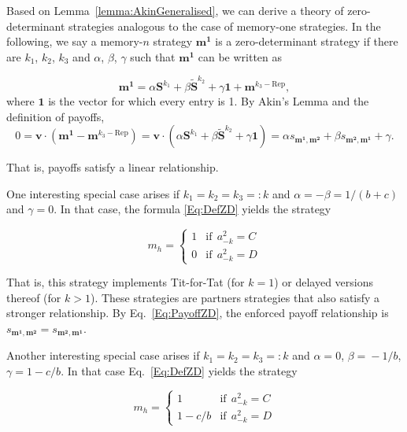 \documentclass{article}
\theoremstyle{definition}
\begin{document}
Based on Lemma~\ref{lemma:AkinGeneralised}, we can derive a theory of
zero-determinant strategies analogous to the case of memory-one strategies. In
the following, we say a memory-$n$ strategy $\mathbf{m^1}$ is a zero-determinant
strategy if there are $k_1$, $k_2$, $k_3$ and $\alpha$, $\beta$, $\gamma$ such
that $\mathbf{m^1}$ can be written as

\begin{equation} \label{Eq:DefZD}
\mathbf{m^1} = \alpha \mathbf{S}^{k_1} + \beta \mathbf{\tilde{S}}^{k_2} + \gamma \mathbf{1} + \mathbf{m}^{k_3-\text{Rep}},  
\end{equation} 
where $\mathbf{1}$ is the vector for which every entry is 1. By Akin's Lemma and the definition of payoffs,
\begin{equation} \label{Eq:PayoffZD}
0 = \mathbf{v} \cdot  (\mathbf{m^1} - \mathbf{m}^{k_3-\text{Rep}}) = \mathbf{v} \cdot (\alpha \mathbf{S}^{k_1} + \beta \mathbf{\tilde{S}}^{k_2} + \gamma \mathbf{1} ) = \alpha s_{\mathbf{m^1}, \mathbf{m^2}} + \beta s_{\mathbf{m^2}, \mathbf{m^1}} + \gamma. 
\end{equation}

That is, payoffs satisfy a linear relationship. 

One interesting special case arises if $k_1\!=\!k_2\!=\!k_3\!=:\!k$ and $\alpha
= -\beta =1/(b\!+\!c)$ and $\gamma=0$. In that case, the formula
\eqref{Eq:DefZD} yields the strategy

\begin{equation}
m_h = \left\{
\begin{array}{ll}
1	&\text{if}~~a^2_{-k}=C\\
0	&\text{if}~~a^2_{-k}=D
\end{array}
\right.
\end{equation}

That is, this strategy implements Tit-for-Tat (for $k\!=\!1$) or delayed
versions thereof (for $k\!>\!1$). These strategies are partners strategies that
also satisfy a stronger relationship. By Eq.~\eqref{Eq:PayoffZD}, the enforced
payoff relationship is $s_{\mathbf{m^1}, \mathbf{m^2}}\!=\! s_{\mathbf{m^2},
\mathbf{m^1}}$.

Another interesting special case arises if  $k_1\!=\!k_2\!=\!k_3\!=:\!k$ and
$\alpha\!=\!0$, $\beta\!=\!-1/b$, $\gamma\!=\!1\!-\!c/b$. In that case
Eq.~\eqref{Eq:DefZD} yields the strategy

\begin{equation}
m_h = \left\{
\begin{array}{ll}
1	&\text{if}~~a^2_{-k}=C\\
1-c/b	&\text{if}~~a^2_{-k}=D
\end{array}
\right.
\end{equation}
\end{document}
